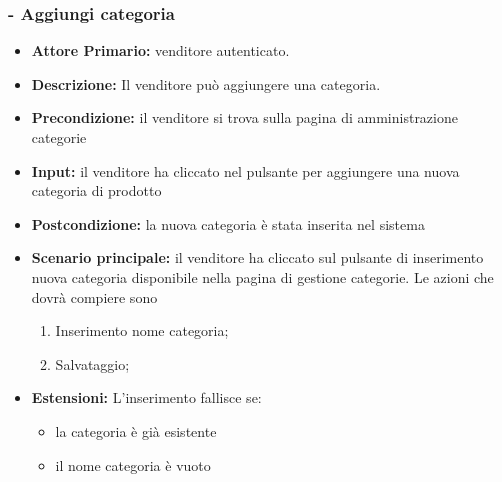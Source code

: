 \subsubsection{- Aggiungi categoria}
\begin{itemize}
    \item \textbf{Attore Primario:}  venditore autenticato.
    \item \textbf{Descrizione:}  Il venditore può aggiungere una categoria.
    \item \textbf{Precondizione:} il venditore si trova sulla pagina di amministrazione categorie
    \item \textbf{Input:} il venditore ha cliccato nel pulsante per aggiungere una nuova categoria di prodotto
    \item \textbf{Postcondizione:} la nuova categoria è stata inserita nel sistema
    \item \textbf{Scenario principale:} il venditore ha cliccato sul pulsante di inserimento nuova categoria disponibile nella pagina di gestione categorie.  Le azioni che dovrà compiere sono
    \begin{enumerate}
        \item Inserimento nome categoria;
        \item Salvataggio;
    \end{enumerate}
    \item \textbf{Estensioni:} L'inserimento fallisce se:
    \begin{itemize}
        \item la categoria è già esistente
        \item il nome categoria è vuoto
    \end{itemize}
\end{itemize}

\stepsubUserCase
